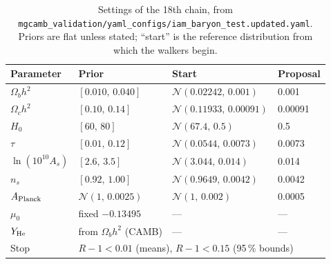 \begin{table}[htbp]\centering\small
\caption[Settings of the 18th chain]{Settings of the 18th chain, from \texttt{mgcamb\_validation/\allowbreak{}yaml\_configs/\allowbreak{}iam\_baryon\_test.updated.yaml}. Priors are flat unless stated; ``start'' is the reference distribution from which the walkers begin.}\label{tab:bc_yaml}
\begin{tabular}{llll}\toprule
Parameter & Prior & Start & Proposal\\\midrule
$\Omega_bh^2$ & $[0.010,\,0.040]$ & $\mathcal N(0.02242,\,0.001)$ & 0.001\\
$\Omega_ch^2$ & $[0.10,\,0.14]$ & $\mathcal N(0.11933,\,0.00091)$ & 0.00091\\
$H_0$ & $[60,\,80]$ & $\mathcal N(67.4,\,0.5)$ & 0.5\\
$\tau$ & $[0.01,\,0.12]$ & $\mathcal N(0.0544,\,0.0073)$ & 0.0073\\
$\ln(10^{10}A_s)$ & $[2.6,\,3.5]$ & $\mathcal N(3.044,\,0.014)$ & 0.014\\
$n_s$ & $[0.92,\,1.00]$ & $\mathcal N(0.9649,\,0.0042)$ & 0.0042\\
$A_{\rm Planck}$ & $\mathcal N(1,\,0.0025)$ & $\mathcal N(1,\,0.002)$ & 0.0005\\
$\mu_0$ & fixed $-0.13495$ & --- & ---\\
$Y_{\rm He}$ & from $\Omega_bh^2$ (CAMB) & --- & ---\\\midrule
Stop & \multicolumn{3}{l}{$R-1<0.01$ (means), $R-1<0.15$ (95\,\% bounds)}\\\bottomrule
\end{tabular}
\end{table}

